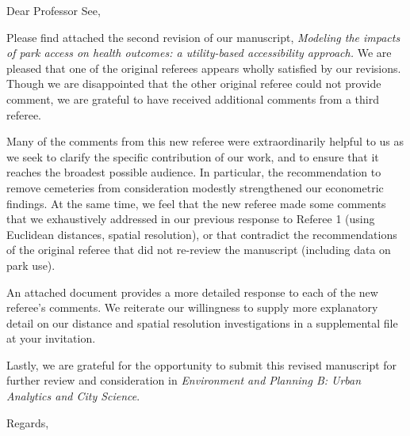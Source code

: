 \documentclass[11pt]{letter} %
\begin{document}

\begin{letter}{
}


\opening{Dear Professor See,}

Please find attached the second revision of our manuscript, \emph{Modeling the
impacts of park access on health outcomes: a utility-based accessibility
approach.}  We are pleased that one of the original referees appears wholly
satisfied by  our revisions. Though we are disappointed that the other original
referee could not provide comment, we are grateful to have received additional
comments from a third referee.

Many of the comments from this new referee were extraordinarily helpful to us as
we seek to clarify the specific contribution of our work, and to ensure that it
reaches the broadest possible audience. In particular, the recommendation to remove
cemeteries from consideration modestly strengthened our econometric findings.
At the same time, we feel that the new referee made some comments that we
exhaustively addressed in our previous response to Referee 1 (using Euclidean
distances, spatial resolution), or that contradict the recommendations of the
original referee that did not re-review the manuscript (including data on park use).

An attached document provides a more detailed response to each of the new
referee's comments. We reiterate our willingness to supply more explanatory detail
on our distance and spatial resolution investigations in a supplemental file at
your invitation.

Lastly, we are grateful for the opportunity to submit this revised manuscript for
further review and consideration in {\em Environment and Planning B: Urban
Analytics and City Science}.


\closing{Regards,}




\end{letter}
\end{document}
